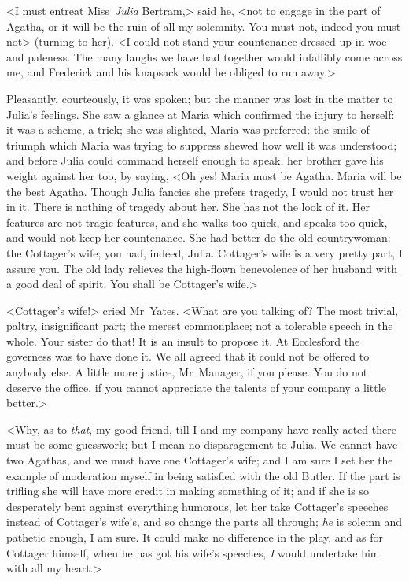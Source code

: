 <I must entreat Miss~\textit{Julia}  Bertram,> said he, <not to engage in the part of Agatha, or it will be the ruin of all my solemnity. You must not, indeed you must not> (turning to her). <I could not stand your countenance dressed up in woe and paleness. The many laughs we have had together would infallibly come across me, and Frederick and his knapsack would be obliged to run away.>

Pleasantly, courteously, it was spoken; but the manner was lost in the matter to Julia's feelings. She saw a glance at Maria which confirmed the injury to herself: it was a scheme, a trick; she was slighted, Maria was preferred; the smile of triumph which Maria was trying to suppress shewed how well it was understood; and before Julia could command herself enough to speak, her brother gave his weight against her too, by saying, <Oh yes! Maria must be Agatha. Maria will be the best Agatha. Though Julia fancies she prefers tragedy, I would not trust her in it. There is nothing of tragedy about her. She has not the look of it. Her features are not tragic features, and she walks too quick, and speaks too quick, and would not keep her countenance. She had better do the old countrywoman: the Cottager's wife; you had, indeed, Julia. Cottager's wife is a very pretty part, I assure you. The old lady relieves the high-flown benevolence of her husband with a good deal of spirit. You shall be Cottager's wife.>

<Cottager's wife!> cried Mr~Yates. <What are you talking of? The most trivial, paltry, insignificant part; the merest commonplace; not a tolerable speech in the whole. Your sister do that! It is an insult to propose it. At Ecclesford the governess was to have done it. We all agreed that it could not be offered to anybody else. A little more justice, Mr~Manager, if you please. You do not deserve the office, if you cannot appreciate the talents of your company a little better.>

<Why, as to \textit{that}, my good friend, till I and my company have really acted there must be some guesswork; but I mean no disparagement to Julia. We cannot have two Agathas, and we must have one Cottager's wife; and I am sure I set her the example of moderation myself in being satisfied with the old Butler. If the part is trifling she will have more credit in making something of it; and if she is so desperately bent against everything humorous, let her take Cottager's speeches instead of Cottager's wife's, and so change the parts all through; \textit{he}  is solemn and pathetic enough, I am sure. It could make no difference in the play, and as for Cottager himself, when he has got his wife's speeches, \textit{I}  would undertake him with all my heart.>

